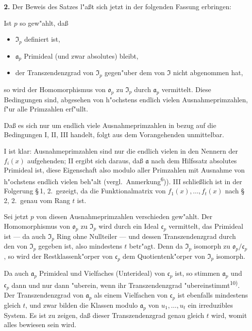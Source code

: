 \medskip\noindent\textbf{2.}
Der Beweis des Satzes l"a\ss t sich jetzt in der folgenden Fassung erbringen:

Ist $p$ so gew"ahlt, da\ss
\begin{itemize}
\item[I.] $\mathfrak{I}_p$ definiert ist,
\item[II.] $\mathfrak{a}_p$ Primideal (und zwar absolutes) bleibt,
\item[III.] der Transzendenzgrad von $\mathfrak{I}_p$ gegen"uber dem von $\mathfrak{I}$ nicht abgenommen hat,
\end{itemize}
so wird der Homomorphismus von $\mathfrak{o}_p$ zu $\mathfrak{I}_p$ durch $\mathfrak{a}_p$ vermittelt. Diese Bedingungen sind, abgesehen von h"ochstens endlich vielen Ausnahmeprimzahlen, f"ur alle Primzahlen erf"ullt.

Da\ss{} es sich nur um endlich viele Ausnahmeprimzahlen in bezug auf die Bedingungen I, II, III handelt, folgt aus dem Vorangehenden unmittelbar.

I ist klar: Ausnahmeprimzahlen sind nur die endlich vielen in den Nennern der $f_i(x)$ aufgehenden; II ergibt sich daraus, da\ss{} $\mathfrak{a}$ nach dem Hilfssatz absolutes Primideal ist, diese Eigenschaft also modulo aller Primzahlen mit Ausnahme von h"ochstens endlich vielen beh"alt (vergl.\ Anmerkung\textsuperscript{6})). III schlie\ss lich ist in der Folgerung \S\,1, 2.\ gezeigt, da die Funktionalmatrix von $f_1(x),\ldots,f_t(x)$ nach \S\,2, 2.\ genau vom Rang $t$ ist.

Sei jetzt $p$ von diesen Ausnahmeprimzahlen verschieden gew"ahlt. Der Homomorphismus von $\mathfrak{o}_p$ zu $\mathfrak{I}_p$ wird durch ein Ideal $\mathfrak{c}_p$ vermittelt, das Primideal ist --- da auch $\mathfrak{I}_p$ Ring ohne Nullteiler --- und dessen Transzendenzgrad durch den von $\mathfrak{I}_p$ gegeben ist, also mindestens $t$ betr"agt. Denn da $\mathfrak{I}_p$ isomorph zu $\mathfrak{o}_p/\mathfrak{c}_p$, so wird der Restklassenk"orper von $\mathfrak{c}_p$ dem Quotientenk"orper von $\mathfrak{I}_p$ isomorph.

Da auch $\mathfrak{a}_p$ Primideal und Vielfaches (Unterideal) von $\mathfrak{c}_p$ ist, so stimmen $\mathfrak{a}_p$ und $\mathfrak{c}_p$ dann und nur dann "uberein, wenn ihr Transzendenzgrad "ubereinstimmt\textsuperscript{10)}. Der Transzendenzgrad von $\mathfrak{a}_p$ als einem Vielfachen von $\mathfrak{c}_p$ ist ebenfalls mindestens gleich $t$, und zwar bilden die Klassen modulo $\mathfrak{a}_p$ von $u_1,\ldots,u_t$ ein irreduzibles System. Es ist zu zeigen, da\ss{} dieser Transzendenzgrad genau gleich $t$ wird, womit alles bewiesen sein wird.

